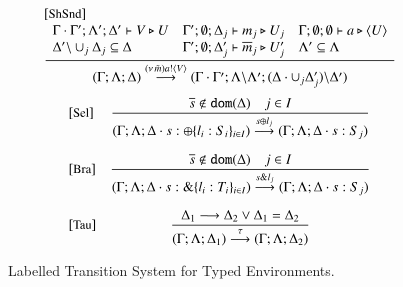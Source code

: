 \begin{figure}[t]
\[\begin{array}{l}
{		}
\\[6mm]
\eltsrule{ShSnd}\\
\tree{
		\begin{array}{lll}
			\Gamma \cat \Gamma' ; \Lambda'; \Delta' \proves V \hastype U &  
		\Gamma'; \es; \Delta_j \proves m_j \hastype U_j
& \Gamma ; \es ; \es \proves a \hastype \chtype{U}
				\\
			\Delta'\backslash \cup_j \Delta_j 
                         \subseteq \Delta
& 
		\Gamma'; \es; \Delta_j' \proves \dual{m}_j\hastype U_j'
& 
				\Lambda' \subseteq \Lambda
			\end{array}
		}{
			(\Gamma ; \Lambda; \Delta) \by{\news{\tilde{m}} \bactout{a}{V}} (\Gamma \cat \Gamma' ; \Lambda\backslash\Lambda';
			(\Delta \cat \cup_j \Delta_j') \backslash \Delta')
		}
\end{array}
\]
\[
\begin{array}{lc}
		\eltsrule{Sel}&\tree{
			\dual{s} \notin \dom{\Delta} \quad j \in I
		}{
			(\Gamma; \Lambda; \Delta \cat s: \btsel{l_i: S_i}_{i \in I}) \by{\bactsel{s}{l_j}} (\Gamma; \Lambda; \Delta \cat s:S_j)
		}
\\[8mm]
		\eltsrule{Bra}&\tree{
			\dual{s} \notin \dom{\Delta} \quad j \in I
		}{
			(\Gamma; \Lambda; \Delta \cat s: \btbra{l_i: T_i}_{i \in I}) \by{\bactbra{s}{l_j}} (\Gamma; \Lambda; \Delta \cat s:S_j)
		}
		\\[8mm]
		\eltsrule{Tau}&\tree{
			\Delta_1 \red \Delta_2 \vee \Delta_1 = \Delta_2
		}{
			(\Gamma; \Lambda; \Delta_1) \by{\tau} (\Gamma; \Lambda; \Delta_2)
		}
	\end{array}
	\]
\caption{Labelled Transition System for Typed Environments. 
\label{fig:envLTS}}
\Hlinefig
\end{figure}

